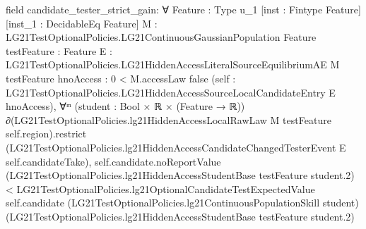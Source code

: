 \documentclass[10pt]{article}
\begin{document}
\begin{ReviewVerbatim}
field candidate_tester_strict_gain:
∀ {Feature : Type u_1} [inst : Fintype Feature] [inst_1 : DecidableEq Feature]
  {M : LG21TestOptionalPolicies.LG21ContinuousGaussianPopulation Feature} {testFeature : Feature}
  {E : LG21TestOptionalPolicies.LG21HiddenAccessLiteralSourceEquilibriumAE M testFeature}
  {hnoAccess : 0 < M.accessLaw {false}}
  (self : LG21TestOptionalPolicies.LG21HiddenAccessSourceLocalCandidateEntry E hnoAccess),
  ∀ᵐ (student :
    Bool ×
      ℝ ×
        (Feature →
          ℝ)) ∂(LG21TestOptionalPolicies.lg21HiddenAccessLocalRawLaw M testFeature self.region).restrict
      (LG21TestOptionalPolicies.lg21HiddenAccessCandidateChangedTesterEvent E self.candidateTake),
    self.candidate.noReportValue (LG21TestOptionalPolicies.lg21HiddenAccessStudentBase testFeature student.2) <
      LG21TestOptionalPolicies.lg21OptionalCandidateTestExpectedValue self.candidate
        (LG21TestOptionalPolicies.lg21ContinuousPopulationSkill student)
        (LG21TestOptionalPolicies.lg21HiddenAccessStudentBase testFeature student.2)
\end{ReviewVerbatim}
\end{document}
